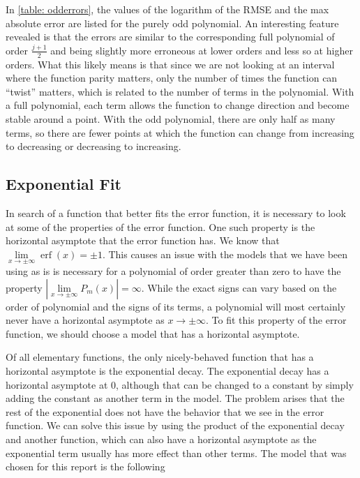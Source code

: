 \documentclass[10pt,a4paper]{article}
\DeclareMathOperator\erf{erf}
\begin{document}
In \cref{table: odderrors}, the values of the logarithm of the RMSE and the max absolute error are listed for the purely odd polynomial. An interesting feature revealed is that the errors are similar to the corresponding full polynomial of order $\frac{j+1}{2}$ and being slightly more erroneous at lower orders and less so at higher orders. What this likely means is that since we are not looking at an interval where the function parity matters, only the number of times the function can ``twist'' matters, which is related to the number of terms in the polynomial. With a full polynomial, each term allows the function to change direction and become stable around a point. With the odd polynomial, there are only half as many terms, so there are fewer points at which the function can change from increasing to decreasing or decreasing to increasing.

\subsection*{Exponential Fit}

In search of a function that better fits the error function, it is necessary to look at some of the properties of the error function. One such property is the horizontal asymptote that the error function has. We know that $\lim\limits_{x \to \pm \infty} \erf{(x)} = \pm1$. This causes an issue with the models that we have been using as is is necessary for a polynomial of order greater than zero to have the property $\left| \lim\limits_{x \to \pm \infty} P_m(x)  \right| = \infty$. While the exact signs can vary based on the order of polynomial and the signs of its terms, a polynomial will most certainly never have a horizontal asymptote as $x \to \pm \infty$. To fit this property of the error function, we should choose a model that has a horizontal asymptote.

Of all elementary functions, the only nicely-behaved function that has a horizontal asymptote is the exponential decay. The exponential decay has a horizontal asymptote at $0$, although that can be changed to a constant by simply adding the constant as another term in the model. The problem arises that the rest of the exponential does not have the behavior that we see in the error function. We can solve this issue by using the product of the exponential decay and another function, which can also have a horizontal asymptote as the exponential term usually has more effect than other terms. The model that was chosen for this report is the following
\end{document}
